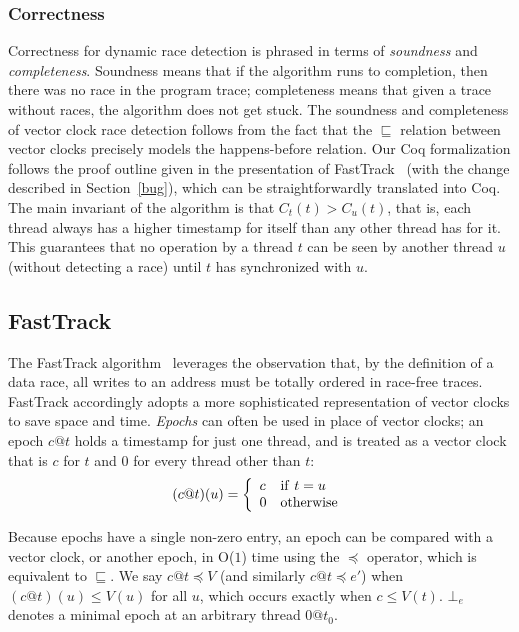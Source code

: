 \documentclass[preprint, 10pt]{sigplanconf}
\newcommand{\Constant}{O($1$)\xspace}
\newcommand{\VCCompare}{\sqsubseteq}
\newcommand{\EpochCompare}{\preceq}
\begin{document}
\subsubsection{Correctness}
Correctness for dynamic race detection is phrased in terms of \emph{soundness} and \emph{completeness}. Soundness means that if the algorithm runs to completion, then there was no race in the program trace; completeness means that given a trace without races, the algorithm does not get stuck. The soundness and completeness of vector clock race detection follows from the fact that the $\sqsubseteq$ relation between vector clocks precisely models the happens-before relation. Our Coq formalization follows the proof outline given in the presentation of FastTrack~\cite{fasttrack} (with the change described in Section~\ref{bug}), which can be straightforwardly translated into Coq. The main invariant of the algorithm is that $C_t(t) > C_u(t)$, that is, each thread always has a higher timestamp for itself than any other thread has for it. This guarantees that no operation by a thread $t$ can be seen by another thread $u$ (without detecting a race) until $t$ has synchronized with $u$.

\subsection{FastTrack}


The FastTrack algorithm~\cite{fasttrack} leverages the observation that, by the definition of a data race, all writes to an address must be totally ordered in race-free traces. FastTrack accordingly adopts a more sophisticated representation of vector clocks to save space and time.
\emph{Epochs} can often be used in place of vector clocks; an epoch $c@t$  holds a timestamp for just one thread, and is treated as a vector clock that is $c$ for $t$ and 0 for every thread other than $t$:
\[
(c@t)(u) = 
\left\{
  \begin{array}[c]{ll}
   c & \mathrm{if}\ t = u \\
   0 & \mathrm{otherwise}
  \end{array}
  \right.
\]

Because epochs have a single non-zero entry, an epoch can be compared with a vector clock, or another epoch, in \Constant time using the $\EpochCompare$ operator, which is equivalent to $\VCCompare$. We say $c@t \EpochCompare V$ (and similarly $c@t \EpochCompare e'$) when $(c@t)(u) \leq V(u)$ for all $u$, which occurs exactly when $c \le V(t)$.
$\bot_e$ denotes a minimal epoch at an arbitrary thread $0@t_0$.
\end{document}
